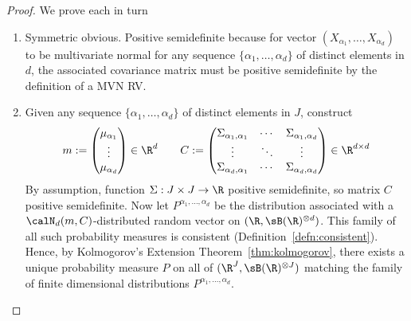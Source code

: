 \documentclass[12pt]{article}
\theoremstyle{plain}
\theoremstyle{definition}
\theoremstyle{remark}
\newcommand{\ra}{\rightarrow}
\begin{document}
\begin{proof}
We prove each in turn
\begin{enumerate}[label=(\roman*)]
  \item Symmetric obvious.
    Positive semidefinite because for vector $(X_{\alpha_1},\ldots,X_{\alpha_d})$
    to be multivariate normal for any sequence
    $\{\alpha_1,\ldots,\alpha_d\}$ of distinct elements in $d$, the associated
    covariance matrix must be positive semidefinite by the definition of
    a MVN RV.
  \item
    Given any sequence $\{\alpha_1,\ldots,\alpha_d\}$ of distinct
    elements in $J$, construct
    \begin{align*}
      m:=
      \begin{pmatrix}
        \mu_{\alpha_1} \\ \vdots \\ \mu_{\alpha_d}
      \end{pmatrix}
      \in \R^d
      \qquad
      C:=
      \begin{pmatrix}
        \Sigma_{\alpha_1,\alpha_1} & \cdots & \Sigma_{\alpha_1,\alpha_d}
        \\
        \vdots & \ddots &\vdots \\
        \Sigma_{\alpha_d,\alpha_1} & \cdots & \Sigma_{\alpha_d,\alpha_d}
      \end{pmatrix}
      \in\R^{d\times d}
    \end{align*}
    By assumption, function $\Sigma:J\times J\ra\R$ positive
    semidefinite, so matrix $C$ positive semidefinite.
    Now let $P^{\alpha_1,\ldots,\alpha_d}$ be the distribution
    associated with a $\calN_d(m,C)$-distributed random vector on
    $(\R,\sB(\R)^{\otimes d})$.
    This family of all such probability measures is consistent
    (Definition~\ref{defn:consistent}).
    Hence, by Kolmogorov's Extension Theorem~\ref{thm:kolmogorov},
    there exists a unique probability measure $P$ on
    all of $(\R^J,\sB(\R)^{\otimes J})$
    matching the family of finite dimensional distributions
    $P^{\alpha_1,\ldots,\alpha_d}$.
\end{enumerate}
\end{proof}
\end{document}
